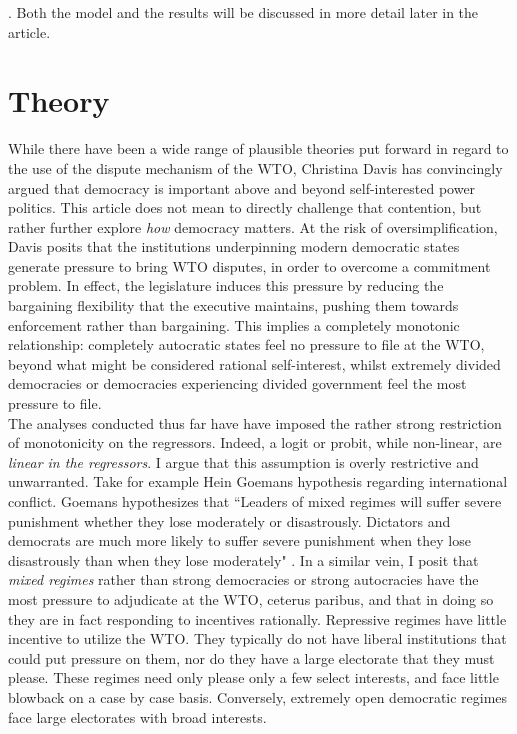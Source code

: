 \documentclass[]{article}
\begin{document}
. Both the model and the results will be discussed in more detail later in the article. 
\section{Theory}
While there have been a wide range of plausible theories put forward in regard to the use of the dispute mechanism of the WTO,  Christina Davis has convincingly argued that democracy is important above and beyond self-interested power politics.  This article does not mean to directly challenge that contention, but rather further explore \textit{how} democracy matters. At the risk of oversimplification, Davis posits that the institutions underpinning modern democratic states generate pressure to bring WTO disputes, in order to overcome a commitment problem.  In effect, the legislature induces this pressure by reducing the bargaining flexibility that the executive maintains, pushing them towards enforcement rather than bargaining. This implies a completely monotonic relationship: completely autocratic states feel no pressure to file at the WTO, beyond what might be considered rational self-interest, whilst extremely divided democracies or democracies experiencing divided government feel the most pressure to file.\\	

The analyses conducted thus far have have imposed the rather strong restriction of monotonicity on the regressors. Indeed, a logit or probit, while non-linear, are \textit{linear in the regressors}. I argue that this assumption is overly restrictive and unwarranted. Take for example Hein Goemans hypothesis regarding international conflict. Goemans hypothesizes that ``Leaders of mixed regimes will suffer severe punishment whether they lose moderately or disastrously. Dictators and democrats are much more likely to suffer severe punishment when they lose disastrously than when they lose moderately" \cite{GGR2000}.  In a similar vein, I posit that \textit{mixed regimes} rather than strong democracies or strong autocracies have the most pressure to adjudicate at the WTO, ceterus paribus, and that in doing so they are in fact responding to incentives rationally. Repressive regimes have little incentive to utilize the WTO. They typically do not have liberal institutions that could put pressure on them, nor do they have a large electorate that they must please. These regimes need only please only a few select interests, and face little blowback on a case by case basis. Conversely, extremely open democratic regimes face large electorates with broad interests.\\ 
\end{document}
